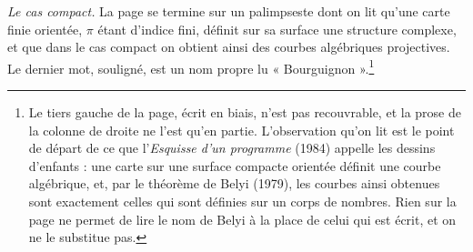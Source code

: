 \documentclass[11pt,a4paper]{article}
\begin{document}
\emph{Le cas compact.} La page se termine sur un palimpseste dont on lit
qu'une carte finie orientée, $\pi$ étant d'indice fini, définit sur sa surface
une structure complexe, et que dans le cas compact on obtient ainsi des
courbes algébriques projectives. Le dernier mot, souligné, est un nom propre
lu « Bourguignon ».\footnote{Le tiers gauche de la page, écrit en biais, n'est
pas recouvrable, et la prose de la colonne de droite ne l'est qu'en partie.
L'observation qu'on lit est le point de départ de ce que l'\emph{Esquisse
d'un programme} (1984) appelle les dessins d'enfants : une carte sur une
surface compacte orientée définit une courbe algébrique, et, par le théorème de
Belyi (1979), les courbes ainsi obtenues sont exactement celles qui sont
définies sur un corps de nombres. Rien sur la page ne permet de lire le nom de
Belyi à la place de celui qui est écrit, et on ne le substitue pas.}
\end{document}

